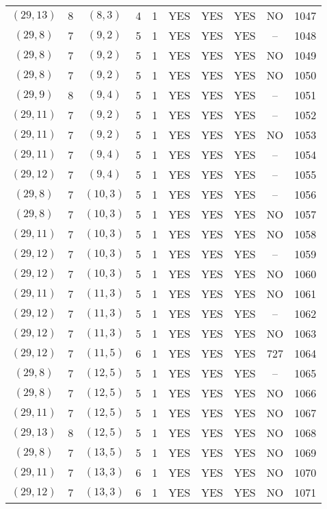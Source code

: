 \begin{longtable}{|c|c|c|c|c|c|c|c|c|c|}
$(29, 13)$ & 8 & $(8, 3)$ & 4 & 1 & YES & YES & YES & NO & 1047\\
$(29, 8)$ & 7 & $(9, 2)$ & 5 & 1 & YES & YES & YES & -- & 1048\\
$(29, 8)$ & 7 & $(9, 2)$ & 5 & 1 & YES & YES & YES & NO & 1049\\
$(29, 8)$ & 7 & $(9, 2)$ & 5 & 1 & YES & YES & YES & NO & 1050\\
$(29, 9)$ & 8 & $(9, 4)$ & 5 & 1 & YES & YES & YES & -- & 1051\\
$(29, 11)$ & 7 & $(9, 2)$ & 5 & 1 & YES & YES & YES & -- & 1052\\
$(29, 11)$ & 7 & $(9, 2)$ & 5 & 1 & YES & YES & YES & NO & 1053\\
$(29, 11)$ & 7 & $(9, 4)$ & 5 & 1 & YES & YES & YES & -- & 1054\\
$(29, 12)$ & 7 & $(9, 4)$ & 5 & 1 & YES & YES & YES & -- & 1055\\
$(29, 8)$ & 7 & $(10, 3)$ & 5 & 1 & YES & YES & YES & -- & 1056\\
$(29, 8)$ & 7 & $(10, 3)$ & 5 & 1 & YES & YES & YES & NO & 1057\\
$(29, 11)$ & 7 & $(10, 3)$ & 5 & 1 & YES & YES & YES & NO & 1058\\
$(29, 12)$ & 7 & $(10, 3)$ & 5 & 1 & YES & YES & YES & -- & 1059\\
$(29, 12)$ & 7 & $(10, 3)$ & 5 & 1 & YES & YES & YES & NO & 1060\\
$(29, 11)$ & 7 & $(11, 3)$ & 5 & 1 & YES & YES & YES & NO & 1061\\
$(29, 12)$ & 7 & $(11, 3)$ & 5 & 1 & YES & YES & YES & -- & 1062\\
$(29, 12)$ & 7 & $(11, 3)$ & 5 & 1 & YES & YES & YES & NO & 1063\\
$(29, 12)$ & 7 & $(11, 5)$ & 6 & 1 & YES & YES & YES & 727 & 1064\\
$(29, 8)$ & 7 & $(12, 5)$ & 5 & 1 & YES & YES & YES & -- & 1065\\
$(29, 8)$ & 7 & $(12, 5)$ & 5 & 1 & YES & YES & YES & NO & 1066\\
$(29, 11)$ & 7 & $(12, 5)$ & 5 & 1 & YES & YES & YES & NO & 1067\\
$(29, 13)$ & 8 & $(12, 5)$ & 5 & 1 & YES & YES & YES & NO & 1068\\
$(29, 8)$ & 7 & $(13, 5)$ & 5 & 1 & YES & YES & YES & NO & 1069\\
$(29, 11)$ & 7 & $(13, 3)$ & 6 & 1 & YES & YES & YES & NO & 1070\\
$(29, 12)$ & 7 & $(13, 3)$ & 6 & 1 & YES & YES & YES & NO & 1071\\

\end{longtable}
